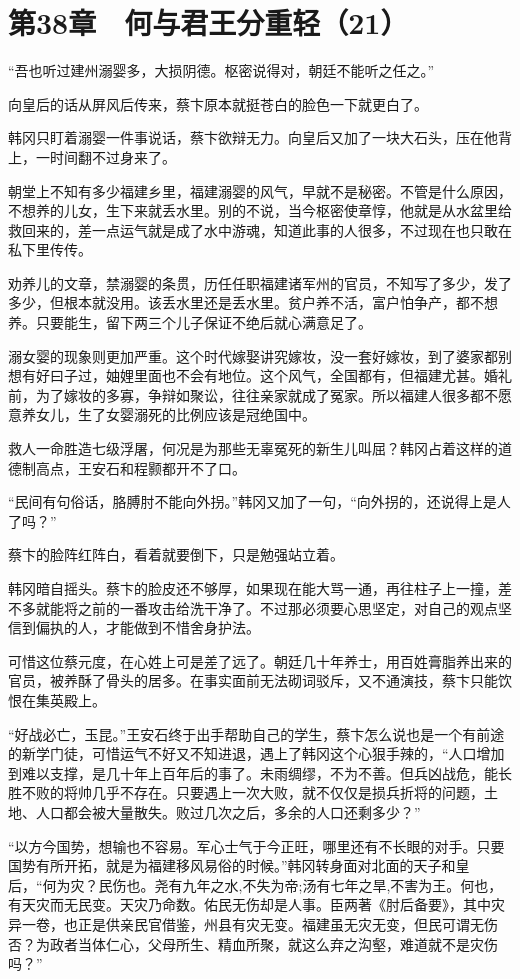 \section{第38章　何与君王分重轻（21）}

“吾也听过建州溺婴多，大损阴德。枢密说得对，朝廷不能听之任之。”

向皇后的话从屏风后传来，蔡卞原本就挺苍白的脸色一下就更白了。

韩冈只盯着溺婴一件事说话，蔡卞欲辩无力。向皇后又加了一块大石头，压在他背上，一时间翻不过身来了。

朝堂上不知有多少福建乡里，福建溺婴的风气，早就不是秘密。不管是什么原因，不想养的儿女，生下来就丢水里。别的不说，当今枢密使章惇，他就是从水盆里给救回来的，差一点运气就是成了水中游魂，知道此事的人很多，不过现在也只敢在私下里传传。

劝养儿的文章，禁溺婴的条贯，历任任职福建诸军州的官员，不知写了多少，发了多少，但根本就没用。该丢水里还是丢水里。贫户养不活，富户怕争产，都不想养。只要能生，留下两三个儿子保证不绝后就心满意足了。

溺女婴的现象则更加严重。这个时代嫁娶讲究嫁妆，没一套好嫁妆，到了婆家都别想有好曰子过，妯娌里面也不会有地位。这个风气，全国都有，但福建尤甚。婚礼前，为了嫁妆的多寡，争辩如聚讼，往往亲家就成了冤家。所以福建人很多都不愿意养女儿，生了女婴溺死的比例应该是冠绝国中。

救人一命胜造七级浮屠，何况是为那些无辜冤死的新生儿叫屈？韩冈占着这样的道德制高点，王安石和程颢都开不了口。

“民间有句俗话，胳膊肘不能向外拐。”韩冈又加了一句，“向外拐的，还说得上是人了吗？”

蔡卞的脸阵红阵白，看着就要倒下，只是勉强站立着。

韩冈暗自摇头。蔡卞的脸皮还不够厚，如果现在能大骂一通，再往柱子上一撞，差不多就能将之前的一番攻击给洗干净了。不过那必须要心思坚定，对自己的观点坚信到偏执的人，才能做到不惜舍身护法。

可惜这位蔡元度，在心姓上可是差了远了。朝廷几十年养士，用百姓膏脂养出来的官员，被养酥了骨头的居多。在事实面前无法砌词驳斥，又不通演技，蔡卞只能饮恨在集英殿上。

“好战必亡，玉昆。”王安石终于出手帮助自己的学生，蔡卞怎么说也是一个有前途的新学门徒，可惜运气不好又不知进退，遇上了韩冈这个心狠手辣的，“人口增加到难以支撑，是几十年上百年后的事了。未雨绸缪，不为不善。但兵凶战危，能长胜不败的将帅几乎不存在。只要遇上一次大败，就不仅仅是损兵折将的问题，土地、人口都会被大量散失。败过几次之后，多余的人口还剩多少？”

“以方今国势，想输也不容易。军心士气于今正旺，哪里还有不长眼的对手。只要国势有所开拓，就是为福建移风易俗的时候。”韩冈转身面对北面的天子和皇后，“何为灾？民伤也。尧有九年之水,不失为帝;汤有七年之旱,不害为王。何也，有天灾而无民变。天灾乃命数。佑民无伤却是人事。臣两著《肘后备要》，其中灾异一卷，也正是供亲民官借鉴，州县有灾无变。福建虽无灾无变，但民可谓无伤否？为政者当体仁心，父母所生、精血所聚，就这么弃之沟壑，难道就不是灾伤吗？”

